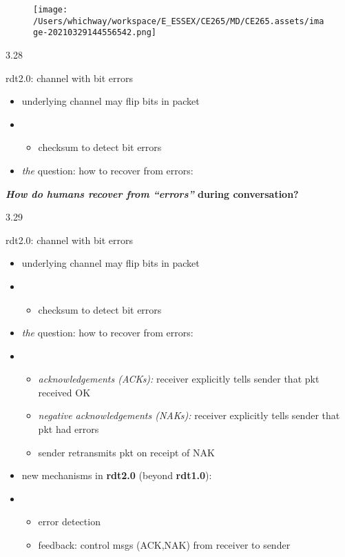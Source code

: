 \documentclass[
]{article}
\begin{document}
\begin{figure}
\centering
\texttt{[image: /Users/whichway/workspace/E\_ESSEX/CE265/MD/CE265.assets/image-20210329144556542.png]}
\caption{}
\end{figure}

3.28

rdt2.0: channel with bit errors

\begin{itemize}
\item
  underlying channel may flip bits in packet
\item
  \begin{itemize}
  \item
    checksum to detect bit errors
  \end{itemize}
\item
  \emph{the} question: how to recover from errors:
\end{itemize}

\textbf{\emph{How do humans recover from ``errors''} during
conversation?}

3.29

rdt2.0: channel with bit errors

\begin{itemize}
\item
  underlying channel may flip bits in packet
\item
  \begin{itemize}
  \item
    checksum to detect bit errors
  \end{itemize}
\item
  \emph{the} question: how to recover from errors:
\item
  \begin{itemize}
  \item
    \emph{acknowledgements (ACKs):} receiver explicitly tells sender
    that pkt received OK
  \item
    \emph{negative acknowledgements (NAKs):} receiver explicitly tells
    sender that pkt had errors
  \item
    sender retransmits pkt on receipt of NAK
  \end{itemize}
\item
  new mechanisms in \textbf{rdt2.0} (beyond \textbf{rdt1.0}):
\item
  \begin{itemize}
  \item
    error detection
  \item
    feedback: control msgs (ACK,NAK) from receiver to sender
  \end{itemize}
\end{itemize}
\end{document}
